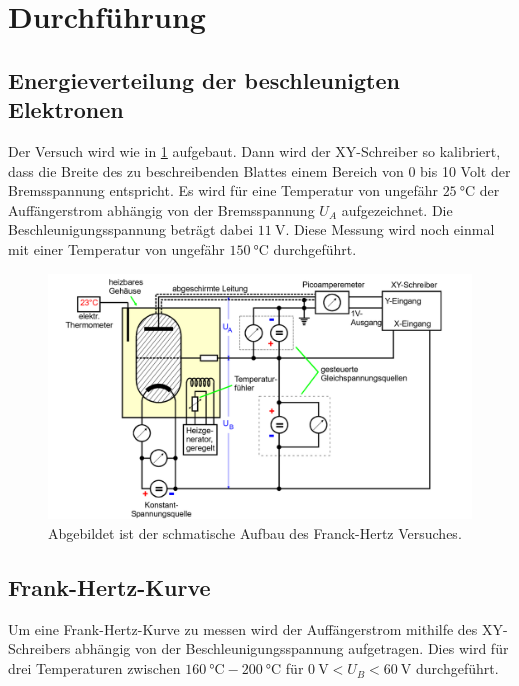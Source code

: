 \section{Durchführung}
\label{sec:Durchführung}

\subsection{Energieverteilung der beschleunigten Elektronen}
Der Versuch wird wie in \ref{fig:Aufbau} aufgebaut.
Dann wird der XY-Schreiber so kalibriert, dass die Breite des zu beschreibenden Blattes einem Bereich von 0 bis 10 Volt der Bremsspannung entspricht.
Es wird für eine Temperatur von ungefähr $\qty{25}{\celsius}$ der Auffängerstrom abhängig von der Bremsspannung $U_A$ aufgezeichnet.
Die Beschleunigungsspannung beträgt dabei $\qty{11}{\volt}$. 
Diese Messung wird noch einmal mit einer Temperatur von ungefähr $\qty{150}{\celsius}$ durchgeführt.


\begin{figure}[H]
    \centering
    \includegraphics[width=\textwidth]{Bilder/Aufbau.png}
    \caption{Abgebildet ist der schmatische Aufbau des Franck-Hertz Versuches.}
    \label{fig:Aufbau}
\end{figure}

\subsection{Frank-Hertz-Kurve}
Um eine Frank-Hertz-Kurve zu messen wird der Auffängerstrom mithilfe des XY-Schreibers abhängig von der Beschleunigungsspannung aufgetragen.
Dies wird für drei Temperaturen zwischen $\qty{160}{\celsius}-\qty{200}{\celsius}$ für $\qty{0}{\volt}<U_B<\qty{60}{\volt}$ durchgeführt.